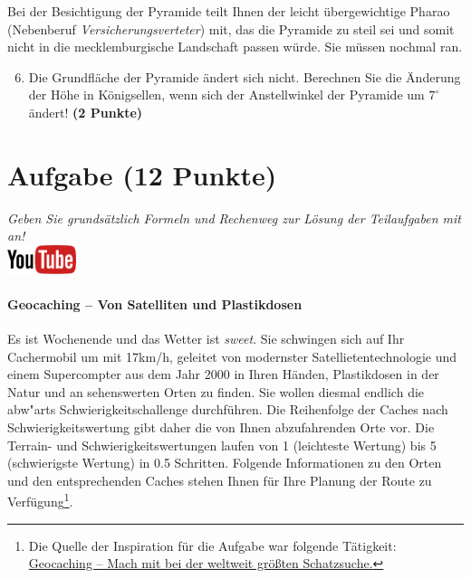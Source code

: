 \documentclass[a4paper, 9pt]{scrartcl}\usepackage[]{graphicx}\usepackage[]{xcolor}
\begin{document}
Bei der Besichtigung der Pyramide teilt Ihnen der leicht {\"u}bergewichtige
Pharao (Nebenberuf \textit{Versicherungsverteter}) mit, das die Pyramide zu
steil sei und somit nicht in die mecklemburgische Landschaft passen
w{\"u}rde. Sie m{\"u}ssen nochmal ran.

\begin{enumerate}
  \setcounter{enumi}{5}
\item Die Grundfl{\"a}che der Pyramide {\"a}ndert sich nicht. Berechnen Sie die
  {\"A}nderung der H{\"o}he in K{\"o}nigsellen, wenn sich der Anstellwinkel der
  Pyramide um $7^\circ$ {\"a}ndert!  \textbf{(2 Punkte)}
\end{enumerate}



\clearpage

\section{Aufgabe \hfill (12 Punkte)}

\textit{Geben Sie grunds{\"a}tzlich Formeln und Rechenweg zur L{\"o}sung der
  Teilaufgaben mit an!} \\[1Ex]

\hfill\href{https://youtu.be/3LAq3R0rS14}{\includegraphics[width =
  2cm]{img/youtube}} %
\hspace{2Ex}

\paragraph{Geocaching -- Von Satelliten und Plastikdosen}



Es ist Wochenende und das Wetter ist \textit{sweet}. Sie schwingen sich auf
Ihr Cachermobil um mit 17km/h, geleitet von modernster
Satellietentechnologie und einem Supercompter aus dem Jahr 2000 in Ihren
H{\"a}nden, Plastikdosen in der Natur und an sehenswerten Orten zu finden. Sie
wollen diesmal endlich die abw{"a}rts Schwierigkeitschallenge
durchf{\"u}hren. Die Reihenfolge der Caches nach Schwierigkeitswertung gibt daher
die von Ihnen abzufahrenden Orte vor. Die Terrain- und
Schwierigkeitswertungen laufen von 1 (leichteste Wertung) bis 5
(schwierigste Wertung) in 0.5 Schritten. Folgende Informationen zu den
Orten und den entsprechenden Caches stehen Ihnen f{\"u}r Ihre Planung der Route
zu Verf{\"u}gung\footnote{Die Quelle der Inspiration
  für die Aufgabe war folgende Tätigkeit:
  \href{https://www.geocaching.com/play}{Geocaching -- Mach mit bei der weltweit größten Schatzsuche.}}.
\end{document}
